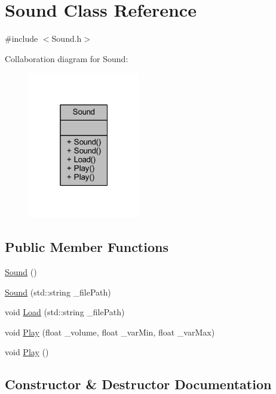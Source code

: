 \hypertarget{class_sound}{}\section{Sound Class Reference}
\label{class_sound}


{\ttfamily \#include $<$Sound.\+h$>$}



Collaboration diagram for Sound\+:
\nopagebreak
\begin{figure}[H]
\begin{center}
\leavevmode
\includegraphics[width=139pt]{class_sound__coll__graph}
\end{center}
\end{figure}
\subsection*{Public Member Functions}
\begin{DoxyCompactItemize}
\item 
\mbox{\hyperlink{class_sound_a539c205cdf06fe2c621fd77c37bcfac9}{Sound}} ()
\item 
\mbox{\hyperlink{class_sound_ae588b8fb94e61912c7ecb5a3cea6f92d}{Sound}} (std\+::string \+\_\+file\+Path)
\item 
void \mbox{\hyperlink{class_sound_aa42f9f9625be20a1a84eeda8fac24cbb}{Load}} (std\+::string \+\_\+file\+Path)
\item 
void \mbox{\hyperlink{class_sound_a5ed28df22c2c96a5c40fa1d2444556d0}{Play}} (float \+\_\+volume, float \+\_\+var\+Min, float \+\_\+var\+Max)
\item 
void \mbox{\hyperlink{class_sound_a8106f65989f5cd4490c6cfe7032cf2b1}{Play}} ()
\end{DoxyCompactItemize}


\subsection{Constructor \& Destructor Documentation}
\mbox{\label{class_sound_a539c205cdf06fe2c621fd77c37bcfac9}} 
